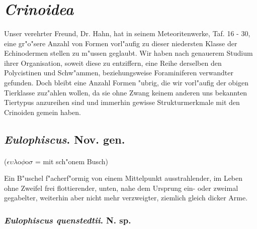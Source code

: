\documentclass[a4paper, 11pt, oneside]{article}
\begin{document}
\section{\emph{Crinoidea}}
\paragraph{}
Unser verehrter Freund, Dr. Hahn, hat in seinem Meteoritenwerke, Taf. 16 - 30, eine gr"o"sere Anzahl von Formen vorl"aufig zu dieser niedersten Klasse der Echinodermen stellen zu m"ussen geglaubt. Wir haben nach genauerem Studium ihrer Organisation, soweit diese zu entziffern, eine Reihe derselben den Polycistinen und Schw"ammen, beziehungsweise Foraminiferen verwandter gefunden. Doch bleibt eine Anzahl Formen "ubrig, die wir vorl"aufig der obigen Tierklasse zuz"ahlen wollen, da sie ohne Zwang keinem anderen uns bekannten Tiertypus anzureihen sind und immerhin gewisse Strukturmerkmale mit den Crinoiden gemein haben.
\subsection{\emph{Eulophiscus}. Nov. gen.}
\paragraph{}
($\epsilon\upsilon\lambda$o$\phi$o$\sigma$ = mit sch"onem Busch)%

Ein B"uschel f"acherf"ormig von einem Mittelpunkt ausstrahlender, im Leben ohne Zweifel frei flottierender, unten, nahe dem Ursprung ein- oder zweimal gegabelter, weiterhin aber nicht mehr verzweigter, ziemlich gleich dicker Arme.
\subsubsection{\emph{Eulophiscus quenstedtii}. N. sp.}
\end{document}
